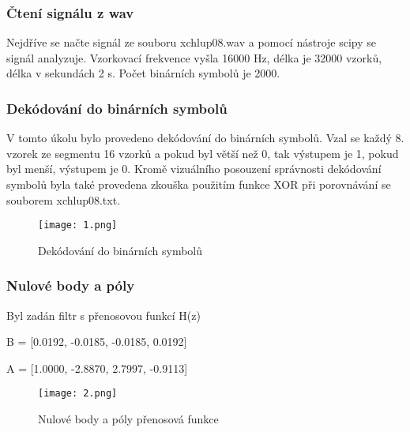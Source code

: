 \documentclass[a4paper,10pt]{article}
\begin{document}
\begin{multicols}{2}
	
\subsubsection*{Čtení signálu z wav}

Nejdříve se načte signál ze souboru xchlup08.wav a pomocí nástroje scipy se signál analyzuje.
Vzorkovací frekvence vyšla 16000 Hz, délka je 32000 vzorků, délka v sekundách 2 s. Počet binárních symbolů je 2000.

\subsubsection*{Dekódování do binárních symbolů}

V tomto úkolu bylo provedeno dekódování do binárních symbolů. Vzal se každý 8. vzorek ze segmentu 16 vzorků a pokud byl větší než 0, tak výstupem je 1, pokud byl menší, výstupem je 0. Kromě vizuálního posouzení správnosti dekódování symbolů byla také provedena zkouška použitím funkce XOR při porovnávání se souborem xchlup08.txt.

\begin{figure}[H]
	\centering
	\texttt{[image: 1.png]}
	\caption{Dekódování do binárních symbolů }
	\label{fig:obr1}
\end{figure}


\subsubsection*{Nulové body a póly }

Byl zadán filtr s přenosovou funkcí H(z)

B = [0.0192, -0.0185, -0.0185, 0.0192] 

A = [1.0000, -2.8870, 2.7997, -0.9113]

\begin{figure}[H]
	\centering
	\texttt{[image: 2.png]}
	\caption{Nulové body a póly přenosová funkce }
	\label{fig:obr2}
\end{figure}


\end{multicols}
\end{document}
